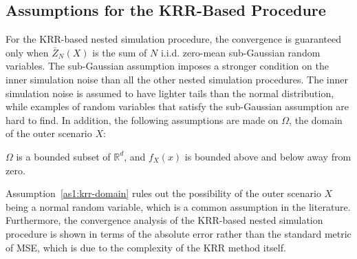 \subsection{Assumptions for the KRR-Based Procedure}
For the KRR-based nested simulation procedure, the convergence is guaranteed only when $\bar{Z}_N(X)$ is the sum of $N$ i.i.d. zero-mean sub-Gaussian random variables.
The sub-Gaussian assumption imposes a stronger condition on the inner simulation noise than all the other nested simulation procedures.
The inner simulation noise is assumed to have lighter tails than the normal distribution, while examples of random variables that satisfy the sub-Gaussian assumption are hard to find.
In addition, the following assumptions are made on $\Omega$, the domain of the outer scenario $X$:

\begin{assumption} \label{as1:krr-domain}
    $\Omega$ is a bounded subset of $\mathbb{R}^d$, and $f_X(x)$ is bounded above and below away from zero.
\end{assumption}

Assumption~\ref{as1:krr-domain} rules out the possibility of the outer scenario $X$ being a normal random variable, which is a common assumption in the literature.
Furthermore, the convergence analysis of the KRR-based nested simulation procedure is shown in terms of the absolute error rather than the standard metric of MSE, which is due to the complexity of the KRR method itself.

